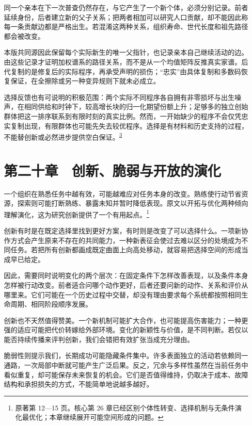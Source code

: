 \documentclass[
  11pt,
  oneside]{book}
\begin{document}
同一个亲本在下一次普查仍然存在，与它产生了一个新个体，必须分别记录。前者延续身份，后者建立新的父子关系；把两者相加可以研究人口贡献，却不能因此称每一条贡献边都是严格出生。若混淆这两种关系，组织寿命、世代长度和祖先路径都会被改变。

本版共同源因此保留每个实际新生的唯一父指针，也记录亲本自己继续活动的边。由这些记录才证明加权谱系的路径关系，而不是从一个均值矩阵反推真实家谱。后代复制的是修复后的实际程序，再承受声明的损伤；``忠实''由具体复制和多数码恢复保证，在全擦除或另一种变异规则下就未必成立。

\begingroup{}

选择反馈也有可说明的积极范围：两个实际不同程序各自拥有非零损坏与出生噪声，在相同供给和时钟下，较高增长块的归一化期望份额上升；足够多的独立创始群体把这一排序联系到有限时刻的真实比例。然而，一开始缺少的程序不会仅凭忠实复制出现，有限群体也可能先失去较优程序。选择是有材料和历史支持的过程，不能替创新或必然进步提供空白保证。\textsuperscript{\hyperlink{ph-note-3}{3}}

\par\endgroup

\chapter{第二十章　创新、脆弱与开放的演化}\label{ph-ch-20}

一个组织在熟悉任务中越有效，可能越难应对任务本身的改变。熟练使行动节省资源，探索则可能打断熟练、暴露未知并暂时降低表现。原文以开拓与优化两种倾向理解演化，这为研究创新提供了一个有用起点。\footnote{\hypertarget{ph-note-50}{}原著第 12---15 页。核心第 26 章已经区别个体性转变、选择机制与无条件演化最优化；本章继续展开可能空间形成的问题。}

创新有时是在既定选择里找到更好方案，有时则是改变了可以选择什么。一项新协作方式会产生原来不存在的共同能力，一种新表征会使过去难以区分的处境成为不同任务。若把所有创新都画成既定曲面上向高处移动，就容易把选择空间的形成当成早已给定。

因此，需要同时说明变化的两个层次：在固定条件下怎样改善表现，以及条件本身怎样被行动改变。前者适合问哪个动作更好，后者还要问新的动作、关系和评价从哪里来。它们可能在一个历史过程中交替，却没有理由要求每个系统都按照相同生命周期、相同阶段顺序发展。

创新也不天然值得赞美。一个新机制可能扩大合作，也可能提高伤害能力；一种更强的适应可能把代价转嫁给外部环境。变化的新颖性与价值，是不同判断。若仅以能否持续传播来评判创新，我们会错把有效扩张当成充分理由。

脆弱性则提示我们，长期成功可能隐藏条件集中。许多表面独立的活动若依赖同一通路，一次局部中断就可能产生广泛后果。反之，冗余与多样性虽然在当前任务中看似重复，却可能保存未来恢复的机会。它们是否值得维持，仍取决于成本、故障结构和承担损失的方式，不能简单地说越多越好。
\end{document}
